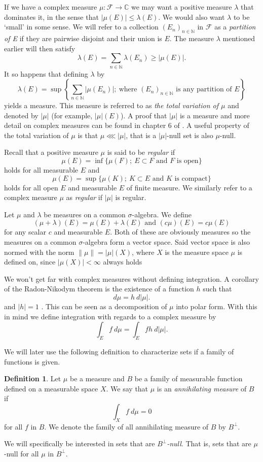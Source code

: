 \documentclass[a4paper,12pt,twoside,BCOR=10mm]{scrbook}
\theoremstyle{definition}
\theoremstyle{definition}
\theoremstyle{definition}
\newtheorem{definition}[theorem]{Definition}
\begin{document}
If we have a complex measure $\mu: \mathcal{F} \rightarrow \mathbb{C}$ we may want a positive measure $\lambda$ that dominates it, in the sense that $|\mu(E)| \leq \lambda(E)$.
We would also want $\lambda$ to be `small' in some sense.
We will refer to a collection $(E_n)_{n \in \mathbb{N}}$ in $\mathcal{F}$ as a \emph{partition of E} if they are pairwise disjoint and their union is $E$.
The measure $\lambda$ mentioned earlier will then satisfy
\[
	\lambda(E) = \sum_{n \in \mathbb{N}} \lambda(E_n) \geq |\mu(E)|.
\]
It so happens that defining $\lambda$ by
\[
	\lambda(E) = \sup \left \{\sum_{n \in \mathbb{N}}|\mu(E_n)|;\ \text{where }(E_n)_{n \in \mathbb{N}}\text{ is any partition of }E \right \}
\]
yields a measure.
This measure is referred to as \emph{\label{index2} the total variation of $\mu$} and denoted by $|\mu|$ (for example, $|\mu|(E)$).
A proof that $|\mu|$ is a measure and more detail on complex measures can be found in chapter $6$ of \citep{rudin2}. 
A useful property of the total variation of $\mu$ is that $\mu \lll |\mu|$, that is a $|\mu|$-null set is also $\mu$-null.

\label{index20}
Recall that a positive measure $\mu$ is said to be \emph{regular} if
\[
	\mu(E) = \inf\{\mu(F);\ E \subset F \text{ and $F$ is open}\}
\]
holds for all measurable $E$ and
\[
	\mu(E) = \sup\{\mu(K);\ K \subset E \text{ and $K$ is compact}\}
\]
holds for all open $E$ and measurable $E$ of finite measure.
We similarly refer to a complex measure $\mu$ as \emph{regular} if $|\mu|$ is regular.

Let $\mu$ and $\lambda$ be measures on a common $\sigma$-algebra.
We define
\[
	(\mu + \lambda)(E) = \mu(E) + \lambda(E) \text{ and } (c\mu)(E) = c\mu(E)
\]
for any scalar $c$ and measurable $E$.
Both of these are obviously measures so the measures on a common $\sigma$-algebra form a vector space.
Said vector space is also normed with the norm \label{index3} $\|\mu\| = |\mu|(X)$, where $X$ is the measure space $\mu$ is defined on, since $|\mu(X)| < \infty$ always holds \citep[Theorem $6.4$]{rudin2}

We won't get far with complex measures without defining integration.
A corollary of the Radon-Nikodym theorem is the existence of a function $h$ such that
\[
	d\mu = h\ d|\mu|.
\]
and $|h| = 1$ \citep[Theroem $6.12$]{rudin2}.
This can be seen as a decomposition of $\mu$ into polar form.
With this in mind we define integration with regards to a complex measure by
\[
	\int_E f\ d\mu = \int_E fh\ d|\mu|.
\]

We will later use the following definition to characterize sets if a family of functions is given.
\begin{definition}
\label{annilatingmeasure}
Let $\mu$ be a measure and $B$ be a family of measurable function defined on a measurable space $X$.
We say that $\mu$ is an \emph{annihilating measure} of $B$ if
\[
	\int_X f\ d\mu = 0
\]
for all $f$ in $B$. We denote the family of all annihilating measure of $B$ by $B^{\bot}$.
\end{definition}
We will specifically be interested in sets that are \emph{$B^{\bot}$-null}.
That is, sets that are $\mu$-null for all $\mu$ in $B^{\bot}$. 
\end{document}
